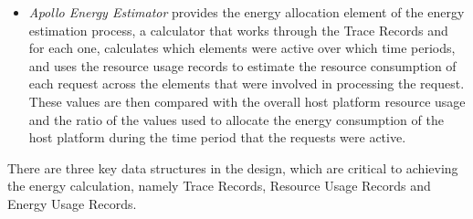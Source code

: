 \begin{itemize}
\item \emph{Apollo Energy Estimator} provides the energy allocation element of the energy estimation process, a calculator that works through the Trace Records and for each one, calculates which elements were active over which time periods, and uses the resource usage records to estimate the resource consumption of each request across the elements that were involved in processing the request.  These values are then compared with the overall host platform resource usage and the ratio of the values used to allocate the energy consumption of the host platform during the time period that the requests were active.

\end{itemize}

There are three key data structures in the design, which are critical to achieving the energy calculation, namely Trace Records, Resource Usage Records and Energy Usage Records.

